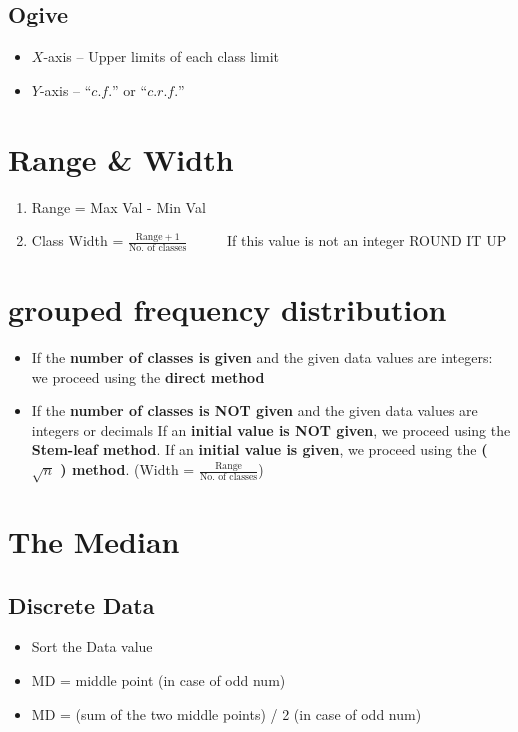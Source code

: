\documentclass[11pt, a4paper]{article}
\begin{document}
      \subsection{Ogive}
      \begin{itemize}
        \item $X$-axis -- Upper limits of each class limit
        \item $Y$-axis -- “$c.f.$” or “$c.r. f.$”
    \end{itemize}


      \section{Range \& Width}
      \begin{enumerate}
          \item Range = Max Val - Min Val
          \item Class Width = $\displaystyle \frac{\text{Range}+1}{\text{No. of classes}}$  {\ \ \ \ \ \small If this value is not an integer ROUND IT UP}
      \end{enumerate}

     \section{ grouped frequency distribution}
     \begin{itemize}
         \item If the \textbf{number of classes is given} and the given data values are integers: we
         proceed using the \textbf{direct method}
         \item If the \textbf{number of classes is NOT given} and the given data values are integers
or decimals
        \subitem If an \textbf{initial value is NOT given}, we proceed using the \textbf{Stem-leaf method}.
        \subitem If an \textbf{initial value is given}, we proceed using the \textbf{(
            $\sqrt{n}$ ) method}. (Width = $\frac{\text{Range}}{\text{No. of classes}}$)
     \end{itemize}

     \section{The Median}

     \subsection{Discrete Data}
     \begin{itemize}
         \item Sort the Data value   
         \item MD = middle point  {\small (in case of odd num)}
         \item MD = (sum of the two middle points) / 2  {\small (in case of odd num)} 
     \end{itemize}
\end{document}
